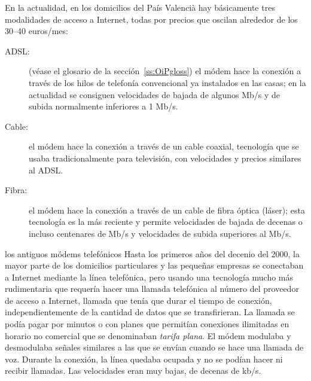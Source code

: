 En la actualidad, en los domicilios del País Valencià hay básicamente tres modalidades de acceso a Internet, todas por precios que oscilan alrededor de los 30--40 euros/mes: \begin{description} \item[ADSL:] (véase el glosario de la sección~\ref{ss:OiPgloss}) el módem hace la conexión a través de los hilos de telefonía convencional ya instalados en las casas; en la actualidad se consiguen velocidades de bajada de algunos Mb/s y de subida normalmente inferiores a 1 Mb/s. \item[Cable:] el módem hace la conexión a través de un cable coaxial, tecnología que se usaba tradicionalmente para televisión, con velocidades y precios similares al ADSL. \item[Fibra:] el módem hace la conexión a través de un cable de fibra óptica (láser); esta tecnología es la más reciente y permite velocidades de bajada de decenas o incluso centenares de Mb/s y velocidades de subida superiores al Mb/s. \end{description} 

\begin{persabermes}{los antiguos módems telefónicos} Hasta los primeros años del decenio del 2000, la mayor parte de los domicilios particulares y las pequeñas empresas se conectaban a Internet mediante la línea telefónica, pero usando una tecnología mucho más rudimentaria que requería hacer una llamada telefónica al número del proveedor de acceso a Internet, llamada que tenía que durar el tiempo de conexión, independientemente de la cantidad de datos que se transfirieran. La llamada se podía pagar por minutos o con planes que permitían conexiones ilimitadas en horario no comercial que se denominaban \emph{tarifa plana}. El módem modulaba y desmodulaba señales similares a las que se envían cuando se hace una llamada de voz. Durante la conexión, la línea quedaba ocupada y no se podían hacer ni recibir llamadas. Las velocidades eran muy bajas, de decenas de kb/s. \end{persabermes} 

